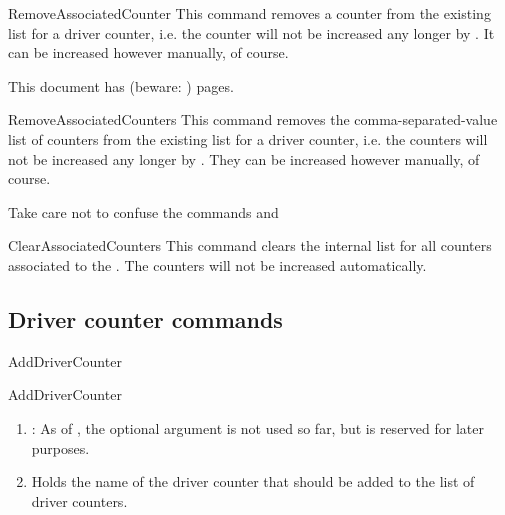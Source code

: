 \documentclass[12pt,paper=a4]{article}
\def\packageversion{\assoccntpackageversion}%
\begin{document}
\begin{docCommand}{RemoveAssociatedCounter}{}
This command removes a counter from the existing list for a driver counter, i.e. the counter will not be increased any longer by . It can be increased however manually, of course. 
\end{docCommand}



\begin{dispExample}
This document has \number{} (beware: \number{}) pages.
\end{dispExample}



\begin{docCommand}{RemoveAssociatedCounters}{}
This command removes the comma-separated-value list of counters from the existing list for a driver counter, i.e. the counters will not be increased any longer by . They can be increased however manually, of course. 

Take care not to confuse the commands 
and{}\linebreak {}
\end{docCommand}

\begin{docCommand}{ClearAssociatedCounters}{}
This command clears the internal list for all counters associated to the . The counters will not be increased automatically.
\end{docCommand}


\clearpage


\subsection{Driver counter commands}


\begin{docCommand}{AddDriverCounter}{}

\begin{docCommandArgs}{AddDriverCounter}%

\begin{enumerate}[label={\textcolor{blue}{\#\arabic*}}]
\item {}: As of \packageversion, the optional argument  is not used so far, but is reserved for later purposes. 

  \item {} 

    Holds the name of the driver counter that should be added to the list of driver counters.
\end{enumerate}

\end{docCommandArgs}

\end{docCommand}%
\end{document}
